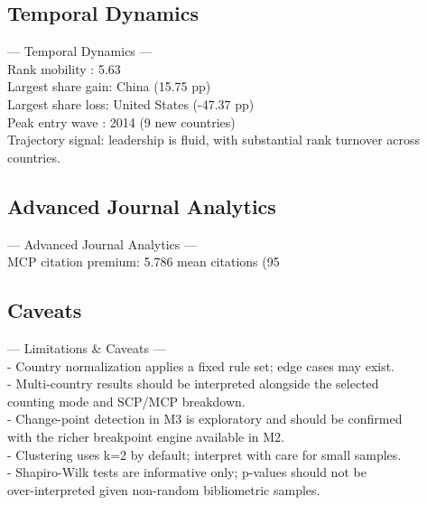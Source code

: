 \subsection*{Temporal Dynamics}
--- Temporal Dynamics ---\\  Rank mobility    : 5.63\\  Largest share gain: China (15.75 pp)\\  Largest share loss: United States (-47.37 pp)\\  Peak entry wave  : 2014 (9 new countries)\\  Trajectory signal: leadership is fluid, with substantial rank turnover across countries.

\subsection*{Advanced Journal Analytics}
--- Advanced Journal Analytics ---\\  MCP citation premium: 5.786 mean citations (95%

\subsection*{Caveats}
--- Limitations & Caveats ---\\  - Country normalization applies a fixed rule set; edge cases may exist.\\  - Multi-country results should be interpreted alongside the selected\\    counting mode and SCP/MCP breakdown.\\  - Change-point detection in M3 is exploratory and should be confirmed\\    with the richer breakpoint engine available in M2.\\  - Clustering uses k=2 by default; interpret with care for small samples.\\  - Shapiro-Wilk tests are informative only; p-values should not be\\    over-interpreted given non-random bibliometric samples.
